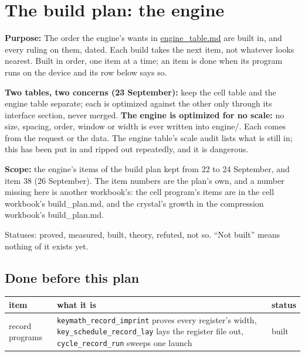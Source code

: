 \chapter{\texorpdfstring{The build plan: the engine}{The build plan: the engine}}
\label{chap:build-plan}

\textbf{Purpose:} The order the engine's wants in \hyperref[chap:engine-table]{engine\_\allowbreak{}table.md} are built in, and every ruling on them, dated. Each build takes the next item, not whatever looks nearest. Built in order, one item at a time; an item is done when its program runs on the device and its row below says so.

\textbf{Two tables, two concerns (23 September):} keep the cell table and the engine table separate; each is optimized against the other only through its interface section, never merged. \textbf{The engine is optimized for no scale:} no size, spacing, order, window or width is ever written into engine/. Each comes from the request or the data. The engine table's scale audit lists what is still in; this has been put in and ripped out repeatedly, and it is dangerous.

\textbf{Scope:} the engine's items of the build plan kept from 22 to 24 September, and item 38 (26 September). The item numbers are the plan's own, and a number missing here is another workbook's: the cell program's items are in the cell workbook's build\_\allowbreak{}plan.md, and the crystal's growth in the compression workbook's build\_\allowbreak{}plan.md.

Statuses: proved, measured, built, theory, refuted, not so. “Not built” means nothing of it exists yet.

\section{\texorpdfstring{Done before this plan}{Done before this plan}}

{\small
\setlength{\tabcolsep}{6pt}
\begin{longtable}{>{\RaggedRight\arraybackslash}p{}>{\RaggedRight\arraybackslash}p{}>{\RaggedRight\arraybackslash}p{}}
\toprule
item & what it is & status \\
\midrule
\endhead
record programs & \texttt{keymath\_\allowbreak{}record\_\allowbreak{}imprint} proves every register's width, \texttt{key\_\allowbreak{}schedule\_\allowbreak{}record\_\allowbreak{}lay} lays the register file out, \texttt{cycle\_\allowbreak{}record\_\allowbreak{}run} sweeps one launch & built \\
\bottomrule
\end{longtable}
}

